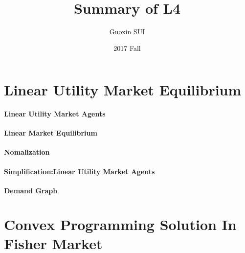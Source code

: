 \documentclass{article}
\title{Summary of L4}
\author{Guoxin SUI}
\date{2017 Fall}
\begin{document}
\maketitle

\section{Linear Utility Market Equilibrium}
\paragraph{Linear Utility Market Agents}
\paragraph{Linear Market Equilibrium}
\paragraph{Nomalization}
\paragraph{Simplification:Linear Utility Market Agents}
\paragraph{Demand Graph}

\section{Convex Programming Solution In Fisher Market}
\end{document}
